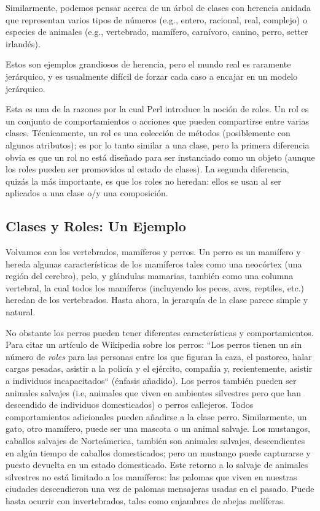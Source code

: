    
  
 
Similarmente, podemos pensar acerca de un árbol de clases con herencia
anidada que representan varios tipos de números (e.g., entero, 
racional, real, complejo) o especies de animales (e.g., vertebrado, 
mamífero, carnívoro, canino, perro, setter irlandés).

Estos son ejemplos grandiosos de herencia, pero el mundo real es
raramente jerárquico, y es usualmente difícil de forzar cada caso 
a encajar en un modelo jerárquico.

Esta es una de la razones por la cual Perl introduce la noción
de roles. Un rol es un conjunto de comportamientos o acciones
que pueden compartirse entre varias clases. Técnicamente, un rol
es una colección de métodos (posiblemente con algunos atributos);
es por lo tanto similar a una clase, pero la primera diferencia
obvia es que un rol no está diseñado para ser instanciado como
un objeto (aunque los roles pueden ser promovidos al estado de
clases). La segunda diferencia, quizás la más importante, es que los
roles no heredan: ellos se usan al ser aplicados a una clase 
o/y una composición.

\subsection{Clases y Roles: Un Ejemplo}

  
Volvamos con los vertebrados, mamíferos y perros. Un perro
es un mamífero y hereda algunas características de los 
mamíferos tales como una neocórtex (una región del cerebro),
pelo, y glándulas mamarias, también como una columna vertebral,
la cual todos los mamíferos (incluyendo los peces, aves, reptiles, etc.)
heredan de los vertebrados. Hasta ahora, la jerarquía de la clase
parece simple y natural.

No obstante los perros pueden tener diferentes características y
comportamientos. Para citar un artículo de Wikipedia sobre los perros:
``Los perros tienen un sin número de \emph{roles} para las personas
entre los que figuran la caza, el pastoreo, halar cargas pesadas, asistir
a la policía y el ejército, compañía y, recientemente, asistir a
individuos incapacitados`` (énfasis añadido). Los perros también pueden 
ser animales salvajes (i.e, animales que viven en ambientes silvestres
pero que han descendido de individuos domesticados) o perros callejeros.
Todos comportamientos adicionales pueden añadirse a la clase perro.
Similarmente, un gato, otro mamífero, puede ser una mascota o
un animal salvaje. Los mustangos, caballos salvajes de Norteámerica,
también son animales salvajes, descendientes en algún tiempo de caballos
domesticados; pero un mustango puede capturarse y puesto devuelta
en un estado domesticado. Este retorno a lo salvaje de animales
silvestres no está limitado a los mamíferos: las palomas que viven
en nuestras ciudades descendieron una vez de palomas mensajeras
usadas en el pasado. Puede hasta ocurrir con invertebrados, tales
como enjambres de abejas melíferas.

